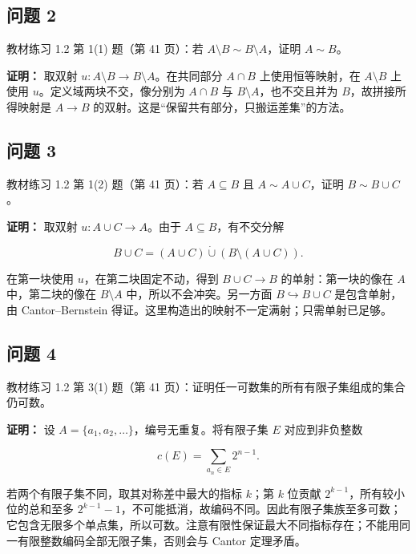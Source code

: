 \documentclass[11pt,a4paper]{article}
\begin{document}
\subsection{问题 2}\label{ux95eeux9898-2}

教材练习 1.2 第 1(1) 题（第 41 页）：若
\(A\setminus B\sim B\setminus A\)，证明 \(A\sim B\)。

\textbf{证明：} 取双射 \(u:A\setminus B\to B\setminus A\)。在共同部分
\(A\cap B\) 上使用恒等映射，在 \(A\setminus B\) 上使用
\(u\)。定义域两块不交，像分别为 \(A\cap B\) 与
\(B\setminus A\)，也不交且并为 \(B\)，故拼接所得映射是 \(A\to B\)
的双射。这是``保留共有部分，只搬运差集''的方法。

\subsection{问题 3}\label{ux95eeux9898-3}

教材练习 1.2 第 1(2) 题（第 41 页）：若 \(A\subseteq B\) 且
\(A\sim A\cup C\)，证明 \(B\sim B\cup C\)。

\textbf{证明：} 取双射 \(u:A\cup C\to A\)。由于
\(A\subseteq B\)，有不交分解

\begin{equation*}
B\cup C=(A\cup C)\mathbin{\dot\cup}(B\setminus(A\cup C)).
\tag{1.2.25}
\end{equation*}

在第一块使用 \(u\)，在第二块固定不动，得到 \(B\cup C\to B\)
的单射：第一块的像在 \(A\) 中，第二块的像在 \(B\setminus A\)
中，所以不会冲突。另一方面 \(B\hookrightarrow B\cup C\) 是包含单射，由
Cantor--Bernstein 得证。这里构造出的映射不一定满射；只需单射已足够。

\subsection{问题 4}\label{ux95eeux9898-4}

教材练习 1.2 第 3(1) 题（第 41
页）：证明任一可数集的所有有限子集组成的集合仍可数。

\textbf{证明：} 设 \(A=\{a_1,a_2,\ldots\}\)，编号无重复。将有限子集
\(E\) 对应到非负整数

\begin{equation*}
c(E)=\sum_{a_n\in E}2^{n-1}.
\tag{1.2.26}
\end{equation*}

若两个有限子集不同，取其对称差中最大的指标 \(k\)；第 \(k\) 位贡献
\(2^{k-1}\)，所有较小位的总和至多
\(2^{k-1}-1\)，不可能抵消，故编码不同。因此有限子集族至多可数；它包含无限多个单点集，所以可数。注意有限性保证最大不同指标存在；不能用同一有限整数编码全部无限子集，否则会与
Cantor 定理矛盾。
\end{document}
